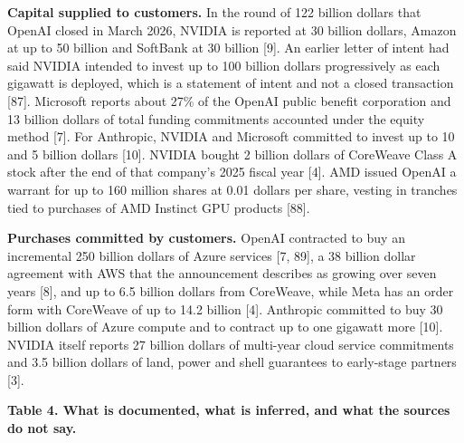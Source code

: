 \documentclass[10pt,letterpaper]{article}
\begin{document}
\textbf{Capital supplied to customers.} In the round of 122 billion
dollars that OpenAI closed in March 2026, NVIDIA is reported at 30
billion dollars, Amazon at up to 50 billion and SoftBank at 30 billion
{[}9{]}. An earlier letter of intent had said NVIDIA intended to invest
up to 100 billion dollars progressively as each gigawatt is deployed,
which is a statement of intent and not a closed transaction {[}87{]}.
Microsoft reports about 27\% of the OpenAI public benefit corporation
and 13 billion dollars of total funding commitments accounted under the
equity method {[}7{]}. For Anthropic, NVIDIA and Microsoft committed to
invest up to 10 and 5 billion dollars {[}10{]}. NVIDIA bought 2 billion
dollars of CoreWeave Class A stock after the end of that company's 2025
fiscal year {[}4{]}. AMD issued OpenAI a warrant for up to 160 million
shares at 0.01 dollars per share, vesting in tranches tied to purchases
of AMD Instinct GPU products {[}88{]}.

\textbf{Purchases committed by customers.} OpenAI contracted to buy an
incremental 250 billion dollars of Azure services {[}7, 89{]}, a 38
billion dollar agreement with AWS that the announcement describes as
growing over seven years {[}8{]}, and up to 6.5 billion dollars from
CoreWeave, while Meta has an order form with CoreWeave of up to 14.2
billion {[}4{]}. Anthropic committed to buy 30 billion dollars of Azure
compute and to contract up to one gigawatt more {[}10{]}. NVIDIA itself
reports 27 billion dollars of multi-year cloud service commitments and
3.5 billion dollars of land, power and shell guarantees to early-stage
partners {[}3{]}.

\textbf{Table 4. What is documented, what is inferred, and what the
sources do not say.}
\end{document}
